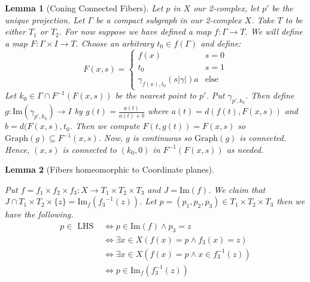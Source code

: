 \documentclass{article}
\theoremstyle{mystyle}
\newtheorem{lem}{Lemma}[section]
\theoremstyle{remark}
\begin{document}
\begin{lem}
    [Coning Connected Fibers]
    \label{lem:confib} 
    Let \(p\) in \(X\) our 2-complex, let \(p'\) be the unique projection. Let \(\Gamma\) be a compact subgraph in our 2-complex \(X\).  Take \(T\) to be either \(T_{1}\) or \(T_{2}\). For now suppose we have defined a map \(f: \Gamma \to T\). We will define a map \(F: \Gamma \times I \to T\). Choose an arbitrary \(t_{0} \in f(\Gamma) \) and define: 
    \[ F(x,s) = 
        \begin{cases} 
            f(x)& s=0\\ 
            t_{0} & s=1\\
            \gamma_{f(x),t_{0}} (s | \gamma |)a & \text{else}
        \end{cases}
    \]
    Let \(k_{0} \in \Gamma \cap F^{-1} (F(x,s))\) be the nearest point to \(p'\). Put \(\gamma_{p',k_{0}}\). Then define \(g: \text{Im} (\gamma_{p',k_{0}}) \to I\) by \(g(t) = \frac{a(t)}{a(t)+b}\) where \(a(t) = d(f(t), F(x,s))\) and \(b = d(F(x,s), t_{0}\). Then we compute \(F(t,g(t))=F(x,s)\) so \(\text{Graph}(g) \subseteq F^{-1} (x,s)\). Now, \(g\) is continuous so \(\text{Graph}(g)\) is connected. Hence, \((x,s)\) is connected to \((k_{0} ,0)\) in \(F^{-1} (F(x,s))\) as needed.
\end{lem}
\begin{lem}
    [Fibers homeomorphic to Coordinate planes]
 \label{lem:fibershomeoplanes} 


    Put \(f =  f_{1} \times f_{2} \times f_{3}: X \to T_{1} \times T_{2} \times T_{3} \) and \(J = \text{Im}(f)\). We claim that \(J \cap T_{1} \times T_{2} \times \{z\} = \text{Im}_{f} ({ f_{3}}^{-1}(z))\). Let \(p = (p_{1}, p_{2} , p_{3}) \in T_{1} \times T_{2} \times T_{3}\) then we have the following. 
    \begin{align*}
        p \in \text { LHS } & \Longleftrightarrow p \in \text{Im}(f) \wedge p_{3} = z \\ 
        & \Longleftrightarrow \exists x \in X (f(x)=p \wedge  f_3(x)=z)\\
        & \Longleftrightarrow \exists x \in X (f(x)=p \wedge x \in f_3^{-1} (z))\\
        & \Longleftrightarrow p \in \text{Im}_f(f_3^{-1} (z))
    \end{align*}
\end{lem}
\end{document}
